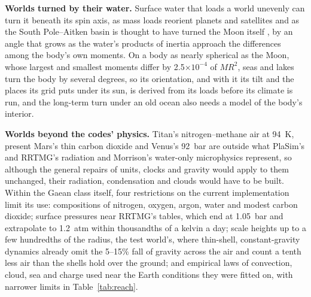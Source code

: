 \textbf{Worlds turned by their water.} Surface water that loads a world unevenly can turn it beneath its spin axis,
as mass loads reorient planets and satellites \autocite{matsuyama2014planetary} and as the South Pole--Aitken
basin is thought to have turned the Moon itself \autocite{keane2014evidence}, by an angle that grows as the
water's products of inertia approach the differences among the body's own moments.
On a body as nearly spherical as the Moon, whose largest and smallest moments differ by
2.5$\times10^{-4}$ of $MR^2$, seas and lakes turn the body by several degrees, so its orientation, and with it its tilt and the places its grid puts under its sun, is derived from its loads before its
climate is run, and the long-term turn under an old ocean also needs a model of the body's interior.

\textbf{Worlds beyond the codes' physics.} Titan's nitrogen--methane air at 94~K, present Mars's thin carbon dioxide
and Venus's 92~bar are outside what PlaSim's and RRTMG's radiation and Morrison's water-only microphysics
represent, so although the general repairs of units, clocks and gravity would apply to them unchanged, their
radiation, condensation and clouds would have to be built. Within the Gaean class itself, four
restrictions on the current implementation limit its use: compositions of nitrogen, oxygen, argon, water and
modest carbon dioxide; surface pressures near RRTMG's tables, which end at 1.05~bar and extrapolate to 1.2~atm within thousandths of a
kelvin a day; scale heights up to a few hundredths of the radius, the test world's, where thin-shell, constant-gravity
dynamics already omit the 5--15\% fall of gravity across the air and count a tenth less air than the shells hold
over the ground; and empirical laws of convection, cloud, sea and charge used
near the Earth conditions they were fitted on, with narrower limits in Table~\ref{tab:reach}.


